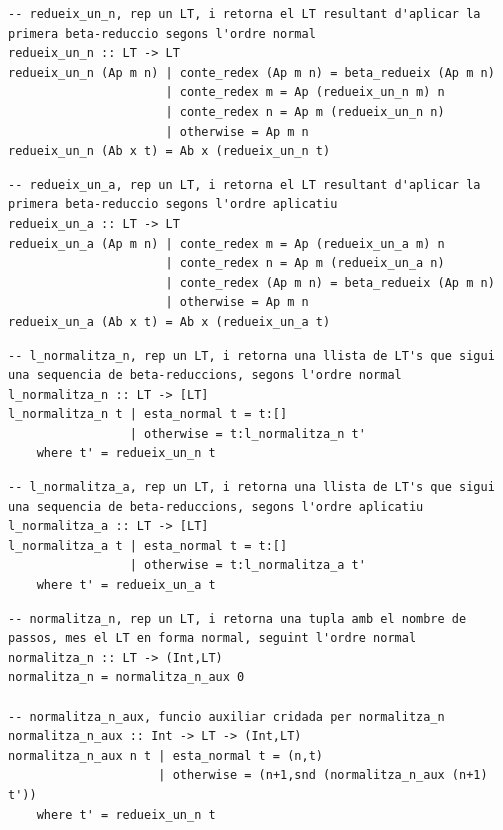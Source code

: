 \documentclass[10pt,a4paper]{article}
\begin{document}
\lstset{language=Haskell, breaklines=true, basicstyle=\footnotesize}
\begin{lstlisting}[frame=mystyle]
-- redueix_un_n, rep un LT, i retorna el LT resultant d'aplicar la primera beta-reduccio segons l'ordre normal
redueix_un_n :: LT -> LT
redueix_un_n (Ap m n) | conte_redex (Ap m n) = beta_redueix (Ap m n)
                      | conte_redex m = Ap (redueix_un_n m) n
                      | conte_redex n = Ap m (redueix_un_n n)
                      | otherwise = Ap m n
redueix_un_n (Ab x t) = Ab x (redueix_un_n t)
\end{lstlisting}



\lstset{language=Haskell, breaklines=true, basicstyle=\footnotesize}
\begin{lstlisting}[frame=mystyle]
-- redueix_un_a, rep un LT, i retorna el LT resultant d'aplicar la primera beta-reduccio segons l'ordre aplicatiu
redueix_un_a :: LT -> LT
redueix_un_a (Ap m n) | conte_redex m = Ap (redueix_un_a m) n
                      | conte_redex n = Ap m (redueix_un_a n)
                      | conte_redex (Ap m n) = beta_redueix (Ap m n)
                      | otherwise = Ap m n
redueix_un_a (Ab x t) = Ab x (redueix_un_a t)
\end{lstlisting}



\lstset{language=Haskell, breaklines=true, basicstyle=\footnotesize}
\begin{lstlisting}[frame=mystyle]
-- l_normalitza_n, rep un LT, i retorna una llista de LT's que sigui una sequencia de beta-reduccions, segons l'ordre normal
l_normalitza_n :: LT -> [LT]
l_normalitza_n t | esta_normal t = t:[]
                 | otherwise = t:l_normalitza_n t'
    where t' = redueix_un_n t
\end{lstlisting}



\lstset{language=Haskell, breaklines=true, basicstyle=\footnotesize}
\begin{lstlisting}[frame=mystyle]
-- l_normalitza_a, rep un LT, i retorna una llista de LT's que sigui una sequencia de beta-reduccions, segons l'ordre aplicatiu
l_normalitza_a :: LT -> [LT]
l_normalitza_a t | esta_normal t = t:[]
                 | otherwise = t:l_normalitza_a t'
    where t' = redueix_un_a t
\end{lstlisting}



\lstset{language=Haskell, breaklines=true, basicstyle=\footnotesize}
\begin{lstlisting}[frame=mystyle]
-- normalitza_n, rep un LT, i retorna una tupla amb el nombre de passos, mes el LT en forma normal, seguint l'ordre normal
normalitza_n :: LT -> (Int,LT)
normalitza_n = normalitza_n_aux 0

-- normalitza_n_aux, funcio auxiliar cridada per normalitza_n
normalitza_n_aux :: Int -> LT -> (Int,LT)
normalitza_n_aux n t | esta_normal t = (n,t)
                     | otherwise = (n+1,snd (normalitza_n_aux (n+1) t'))
    where t' = redueix_un_n t
\end{lstlisting}
\end{document}
